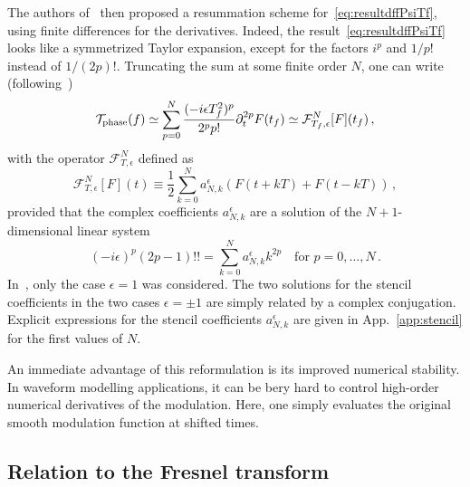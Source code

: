 \documentclass[aps,showpacs,twocolumn,
prd,superscriptaddress,nofootinbib]{revtex4-1}
\newcommand{\be}{\begin{equation}}
\newcommand{\ee}{\end{equation}}
\newcommand\calF{{\mathcal{F}}}
\newcommand\calT{{\mathcal{T}}}
\newcommand{\tf}{t_{f}}
\newcommand{\Tf}{T_{f}}
\begin{document}
The authors of~\cite{KCY14} then proposed a resummation scheme for~\eqref{eq:resultdffPsiTf}, using finite differences for the derivatives. Indeed, the result~\eqref{eq:resultdffPsiTf} looks like a symmetrized Taylor expansion, except for the factors $i^{p}$ and $1/p!$ instead of $1/(2p)!$. Truncating the sum at some finite order $N$, one can write (following~\cite{KCY14})
\be\label{eq:stencilresult}
	\calT_{\rm phase}(f) \simeq \sum\limits_{p = 0}^{N} \frac{(-i\epsilon\Tf^{2})^{p}}{2^{p}p!} \partial_{t}^{2p}F(\tf) \simeq \calF^{N}_{\Tf, \epsilon}[F] (\tf) \,,
\ee
with the operator $\calF_{T, \epsilon}^{N}$ defined as
\be\label{eq:stencilfresnel}
	\calF_{T, \epsilon}^{N}[F] (t) \equiv \frac{1}{2}\sum\limits_{k=0}^{N} a_{N,k}^{\epsilon} \left( F(t + kT) + F(t - k T) \right) \,,
\ee
provided that the complex coefficients $a_{N,k}^{\epsilon}$ are a solution of the $N+1$-dimensional linear system~\cite{KCY14}
\be\label{eq:stencilsystem}
	(-i\epsilon)^{p} (2p-1)!! = \sum\limits_{k=0}^{N} a_{N,k}^{\epsilon} k^{2p} \quad \text{for } p=0,\dots,N \,.
\ee
In~\cite{KCY14}, only the case $\epsilon=1$ was considered. The two solutions for the stencil coefficients in the two cases $\epsilon = \pm 1$ are simply related by a complex conjugation. Explicit expressions for the stencil coefficients $a_{N,k}^{\epsilon}$ are given in App.~\ref{app:stencil} for the first values of $N$.

An immediate advantage of this reformulation is its improved numerical stability. In waveform modelling applications, it can be bery hard to control high-order numerical derivatives of the modulation. Here, one simply evaluates the original smooth modulation function at shifted times.


\subsection{Relation to the Fresnel transform}
\label{subsec:fresneltransform}
\end{document}
